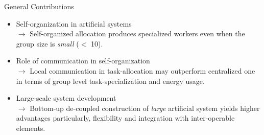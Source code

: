 \documentclass{beamer}
\begin{document}
\begin{frame}[t]{General Contributions}
%
\begin{itemize}
    \item \normalsize \alert{Self-organization in artificial systems}\\ 
$\rightarrow$ \small Self-organized allocation produces specialized workers even when the group size is \textit{small} ($<$ 10).
    \item \normalsize \alert{Role of communication in self-organization}\\
$\rightarrow$ \small  Local communication in task-allocation may outperform centralized one in terms of group level task-specialization and energy usage.
\item \normalsize \alert{Large-scale system development}\\
$\rightarrow$ \small Bottom-up de-coupled construction of \textit{large} artificial system yields higher advantages particularly, flexibility and integration with inter-operable elements.%
\end{itemize}
%
\end{frame}
%
\end{document}

